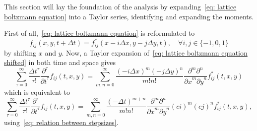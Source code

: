 This section will lay the foundation of the analysis by expanding~\eqref{eq: lattice boltzmann equation} into a Taylor series, identifying and expanding the moments.

First of all,~\eqref{eq: lattice boltzmann equation} is reformulated to
\begin{equation}
  \label{eq: lattice boltzmann equation shifted}
  f_{ij}(x, y, t + \Delta t) = f^*_{ij}(x - i \Delta x , y - j\Delta y, t), \quad\forall i,j\in \{-1, 0, 1\}
\end{equation}
by shifting $x$ and $y$. Now, a Taylor expansion of~\eqref{eq: lattice boltzmann equation shifted} in both time and space gives
\begin{equation*}
  \sum_{\tau = 0}^\infty \frac{{\Delta t}^\tau }{\tau!} \frac{\partial^\tau}{{\partial t}^\tau} f_{ij}(t, x, y) =
  \sum_{m,n = 0}^\infty \frac{{(-i\Delta x)}^m{(-j\Delta y)}^n} {m!n!} \frac{\partial^m \partial^n}{ {\partial x}^m{\partial y}^n} f^*_{ij}(t, x, y)
\end{equation*}
which is equivalent to
\begin{equation}
  \label{eq: Taylor LB1}
  \sum_{\tau = 0}^\infty \frac{{\Delta t}^\tau }{\tau!} \frac{\partial^\tau}{{\partial t}^\tau} f_{ij}(t, x, y) =
    \sum_{m,n = 0}^\infty \frac{{(-\Delta t)}^{m+n}} {m!n!} \frac{\partial^m \partial^n}{ {\partial x}^m{\partial y}^n} {(ci)}^m {(cj)}^n f^*_{ij}(t, x, y),
\end{equation}
using~\eqref{eq: relation between stepsizes}.

